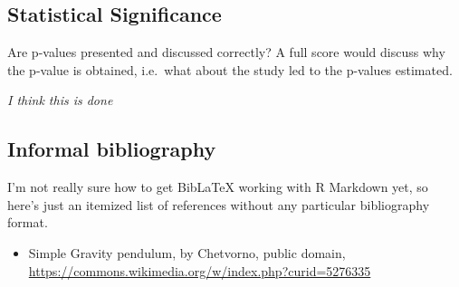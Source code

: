 \documentclass[
]{article}
\providecommand{\tightlist}{%
  \setlength{\itemsep}{0pt}\setlength{\parskip}{0pt}}
\begin{document}
\subsection{Statistical Significance}\label{statistical-significance}

Are p-values presented and discussed correctly? A full score would
discuss why the p-value is obtained, i.e.~what about the study led to
the p-values estimated.

\emph{I think this is done}

\subsection{Informal bibliography}\label{informal-bibliography}

I'm not really sure how to get BibLaTeX working with R Markdown yet, so
here's just an itemized list of references without any particular
bibliography format.

\begin{itemize}
\tightlist
\item
  Simple Gravity pendulum, by Chetvorno, public domain,
  \url{https://commons.wikimedia.org/w/index.php?curid=5276335}
\end{itemize}
\end{document}
